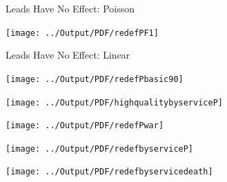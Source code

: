 \documentclass[12pt] {article}
\begin{document}

\pagebreak{}
\clearpage{}
\begin{table}
\caption{}
\label{Flo:Rdeathslinear}
\scalebox{0.9}{

}
\end{table}




\pagebreak{}
\clearpage{}
\begin{table}
\caption{Leads Have No Effect: Poisson}
\label{Flo:redefPF1}
\texttt{[image: ../Output/PDF/redefPF1]}
\end{table}

\pagebreak{}
\clearpage{}
\begin{table}
\caption{Leads Have No Effect: Linear}
\label{Flo:forwardbasicLN}

\end{table}

\pagebreak{}
\clearpage{}
\begin{table}
\caption{}
\label{Flo:alldeaths90}
\texttt{[image: ../Output/PDF/redefPbasic90]}
\end{table}

\pagebreak{}
\clearpage{}
\begin{table}
\caption{}
\label{Flo:Recruits by Service}\texttt{[image: ../Output/PDF/highqualitybyserviceP]}
\end{table}

\pagebreak{}
\begin{table}
\caption{}
\label{Flo:Deaths by WarP}
\texttt{[image: ../Output/PDF/redefPwar]}
\end{table}

\pagebreak{}
\clearpage{}
\begin{table}
\caption{}
\label{Flo:Death by Same-Service Other-Service}\texttt{[image: ../Output/PDF/redefbyserviceP]}
\end{table}

\clearpage{}
\pagebreak{}
\begin{table}
\caption{}
\label{Flo: Death by Service}\texttt{[image: ../Output/PDF/redefbyservicedeath]}
\end{table}
\end{document}
